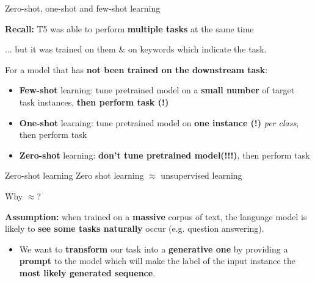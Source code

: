 \documentclass[12pt,aspectratio=169,handout]{beamer}
\begin{document}
\begin{frame}{Zero-shot, one-shot and few-shot learning}

\textbf{Recall:} T5 was able to perform \textbf{multiple tasks} at the same time

... but it was trained on them \& on keywords which indicate the task.
\vspace{1em}
\pause

For a model that has \textbf{not been trained on the downstream task}:
\begin{itemize}
	\item \textbf{Few-shot} learning: tune pretrained model on a \textbf{small number} of target task instances, \textbf{then perform task (!)}
	\pause
	\item \textbf{One-shot} learning: tune pretrained model on \textbf{one instance (!)} \textit{per class}, then perform task
	\pause
	\item \textbf{Zero-shot} learning: \textbf{don't tune pretrained model}\textbf{(!!!)}, then perform task 
\end{itemize}

\end{frame}

\begin{frame}{Zero-shot learning}
	Zero shot learning $\approx$ unsupervised learning
	\pause

	\vspace{1em}
	Why $\approx$?
	\pause

	\textbf{Assumption:} when trained on a \textbf{massive} corpus of text, the language model is likely to \textbf{see some tasks naturally} occur (e.g. question answering).

	\pause
	\begin{itemize}
		\item We want to \textbf{transform} our task into a \textbf{generative one} by providing a \textbf{prompt} to the model which will make the label of the input instance the \textbf{most likely generated sequence}.
	\end{itemize}
	
\end{frame}
\end{document}
